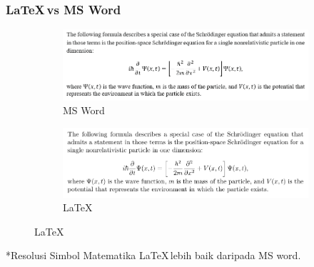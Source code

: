 \documentclass[aspectratio=169,10pt]{beamer}
\begin{document}
\begin{frame}
    \frametitle{\LaTeX$\,$vs MS Word}
    \begin{figure}
        \begin{subfigure}[t!]{0.6\linewidth}
            \captionsetup{labelformat=empty}
            \caption{MS Word}
            \includegraphics[width=\linewidth]{WordEQ.png}
        \end{subfigure}
        \begin{subfigure}[b!]{0.6\linewidth}
            \captionsetup{labelformat=empty}
            \caption{\LaTeX}
            \includegraphics[width=\linewidth]{LatexEQ.png}
        \end{subfigure}
    \end{figure}
    *Resolusi Simbol Matematika \LaTeX$\,$lebih baik daripada MS word.
\end{frame}
\end{document}
